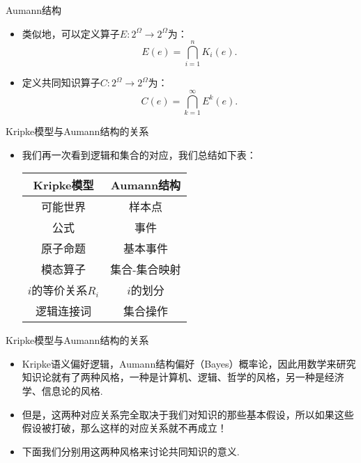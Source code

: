 \begin{frame}{Aumann结构}
\begin{itemize}
    \item 类似地，可以定义算子$E:2^\Omega\to 2^\Omega$为：
    \[E(e)=\bigcap_{i=1}^n K_i(e).\]
    \item 定义共同知识算子$C:2^\Omega\to 2^\Omega$为：
    \[C(e)=\bigcap_{k=1}^\infty E^k(e).\]
\end{itemize}
\end{frame}

\begin{frame}{Kripke模型与Aumann结构的关系}
\begin{itemize}
    \item 我们再一次看到逻辑和集合的对应，我们总结如下表：
    \begin{table}[ht]
        \centering
        \begin{tabular}{cc}
        \toprule
             Kripke模型&Aumann结构  \\\midrule
             可能世界&样本点\\
             公式&事件\\
             原子命题&基本事件\\
             模态算子&集合-集合映射\\
             $i$的等价关系$R_i$&$i$的划分\\
             逻辑连接词&集合操作\\\bottomrule
        \end{tabular}
    \end{table}
\end{itemize}
\end{frame}

\begin{frame}{Kripke模型与Aumann结构的关系}
\begin{itemize}
    \item Kripke语义偏好逻辑，Aumann结构偏好（Bayes）概率论，因此用数学来研究知识论就有了两种风格，一种是计算机、逻辑、哲学的风格，另一种是经济学、信息论的风格.
    \item 但是，这两种对应关系完全取决于我们对知识的那些基本假设，所以如果这些假设被打破，那么这样的对应关系就不再成立！
    \item 下面我们分别用这两种风格来讨论共同知识的意义.
\end{itemize}
\end{frame}


